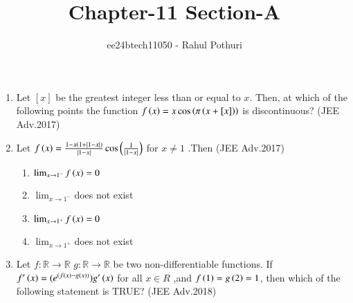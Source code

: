 \documentclass[journal,12pt,twocolumn]{IEEEtran}
\theoremstyle{remark}
\begin{document}

\vspace{3cm}
\title{Chapter-11 Section-A }
\author{ee24btech11050 - Rahul Pothuri}
\maketitle
\newpage
\bigskip
\renewcommand{\thefigure}{\theenumi}
\renewcommand{\thetable}{\theenumi}
\begin{enumerate}[start=26]
\item %
Let $[x]$ be the greatest integer less than or equal to $x$. Then, at which of the following points the function
$f\left(x\right) = x \cos\left(\pi\left(x + [x]\right)\right)$ is discontinuous? 
 \hfill  (JEE Adv.2017) \\
\begin{enumerate} 
\end{enumerate}
\item %
 Let $f\left(x\right)=\frac{1-x \left(1+\left\vert1-x\right\vert\right)}{\left\vert1-x\right\vert}\cos\left(\frac{1}{\left\vert1-x\right\vert}\right)$ for $x\neq1$ .Then  
\hfill (JEE Adv.2017) \\ 
\begin{enumerate}
\item $\lim_{x\to1^-} f\left(x\right)=0$ 
\item $\lim_{x\to1^-}$does not exist
\item $\lim_{x\to1^+} f\left(x\right)=0$ 
\item $\lim_{x\to1^+}$does not exist 
\end{enumerate}
\item %
Let $f:\mathbb{R} \to \mathbb{R}$ $g:\mathbb{R} \to \mathbb{R}$ be two non-differentiable functions. If $f'\left(x\right)=(e^{\left(f\left(x\right)-g\left(x\right)\right)})g'\left(x\right)$ for all $x\in R$ ,and $f\left(1\right)=g\left(2\right)=1$, then which of the following statement  is  TRUE? 
\hfill  (JEE Adv.2018) \\ 
\begin{enumerate}
\end{enumerate}
\end{enumerate}
\end{document}
